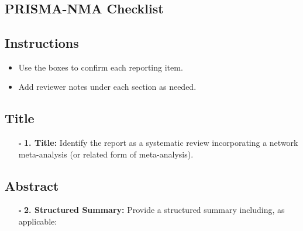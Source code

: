 \documentclass[11pt]{article}
\def\tightlist{}
\begin{document}
\begin{center}
{\LARGE }\\[4pt]
\normalsize 
\end{center}
\vspace{1em}

\begin{Form}

\section{PRISMA-NMA Checklist}\label{prisma-nma-checklist}

\subsection{Instructions}\label{instructions}

\begin{itemize}
\tightlist
\item
  Use the boxes to confirm each reporting item.
\item
  Add reviewer notes under each section as needed.
\end{itemize}

\subsection{Title}\label{title}

\begin{itemize}
\tightlist
\item[$\square$]
  \textbf{1. Title:} Identify the report as a systematic review
  incorporating a network meta-analysis (or related form of
  meta-analysis).
\end{itemize}

\subsection{Abstract}\label{abstract}

\begin{itemize}
\tightlist
\item[$\square$]
  \textbf{2. Structured Summary:} Provide a structured summary
  including, as applicable:


\end{itemize}
\end{Form}
\end{document}
